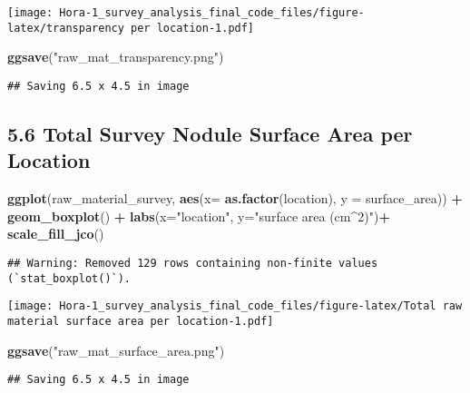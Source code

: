 \documentclass[
]{article}
\newenvironment{Shaded}{\begin{snugshade}}{\end{snugshade}}
\newcommand{\AttributeTok}[1]{\textcolor[rgb]{0.13,0.29,0.53}{#1}}
\newcommand{\FunctionTok}[1]{\textcolor[rgb]{0.13,0.29,0.53}{\textbf{#1}}}
\newcommand{\NormalTok}[1]{#1}
\newcommand{\SpecialCharTok}[1]{\textcolor[rgb]{0.81,0.36,0.00}{\textbf{#1}}}
\newcommand{\StringTok}[1]{\textcolor[rgb]{0.31,0.60,0.02}{#1}}
\begin{document}
\texttt{[image: Hora-1\_survey\_analysis\_final\_code\_files/figure-latex/transparency per location-1.pdf]}

\begin{Shaded}
\begin{Highlighting}[]
\FunctionTok{ggsave}\NormalTok{(}\StringTok{"raw\_mat\_transparency.png"}\NormalTok{)}
\end{Highlighting}
\end{Shaded}

\begin{verbatim}
## Saving 6.5 x 4.5 in image
\end{verbatim}

\hypertarget{total-survey-nodule-surface-area-per-location}{%
\subsection{5.6 Total Survey Nodule Surface Area per
Location}\label{total-survey-nodule-surface-area-per-location}}

\begin{Shaded}
\begin{Highlighting}[]
\FunctionTok{ggplot}\NormalTok{(raw\_material\_survey, }\FunctionTok{aes}\NormalTok{(}\AttributeTok{x=} \FunctionTok{as.factor}\NormalTok{(location), }\AttributeTok{y =}\NormalTok{ surface\_area)) }\SpecialCharTok{+}
  \FunctionTok{geom\_boxplot}\NormalTok{() }\SpecialCharTok{+}
  \FunctionTok{labs}\NormalTok{(}\AttributeTok{x=}\StringTok{"location"}\NormalTok{, }\AttributeTok{y=}\StringTok{"surface area (cm\^{}2)"}\NormalTok{)}\SpecialCharTok{+}
  \FunctionTok{scale\_fill\_jco}\NormalTok{() }
\end{Highlighting}
\end{Shaded}

\begin{verbatim}
## Warning: Removed 129 rows containing non-finite values (`stat_boxplot()`).
\end{verbatim}

\texttt{[image: Hora-1\_survey\_analysis\_final\_code\_files/figure-latex/Total raw material surface area per location-1.pdf]}

\begin{Shaded}
\begin{Highlighting}[]
\FunctionTok{ggsave}\NormalTok{(}\StringTok{"raw\_mat\_surface\_area.png"}\NormalTok{)}
\end{Highlighting}
\end{Shaded}

\begin{verbatim}
## Saving 6.5 x 4.5 in image
\end{verbatim}
\end{document}
